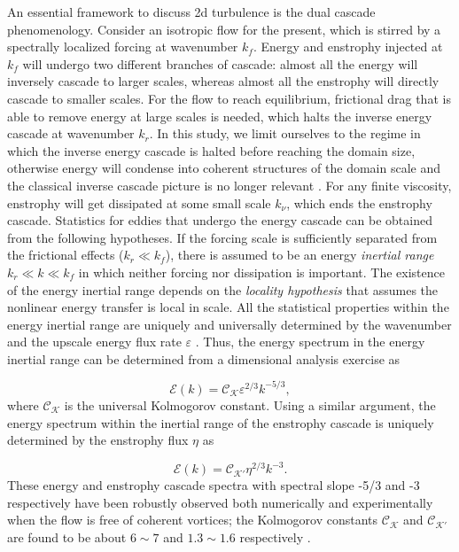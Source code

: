 \documentclass{ametsoc}
\begin{document}
An essential framework to discuss 2d turbulence is the dual
cascade phenomenology. Consider an isotropic flow for the present,
which is stirred by a spectrally localized forcing at wavenumber $k_{f}$.
Energy and enstrophy injected at $k_{f}$ will undergo two different
branches of cascade: almost all the energy will inversely cascade
to larger scales, whereas almost all the enstrophy will directly cascade
to smaller scales. For the flow to reach equilibrium, frictional drag
that is able to remove energy at large scales is needed, which halts
the inverse energy cascade at wavenumber $k_{r}$. In this study,
we limit ourselves to the regime in which the inverse energy cascade is
halted before reaching the domain size, otherwise energy will condense
into coherent structures of the domain scale and the classical inverse
cascade picture is no longer relevant \citep{Smith1993,Chertkov2007}.
For any finite viscosity, enstrophy will get dissipated at some small
scale $k_{\nu}$, which ends the enstrophy cascade. Statistics for
eddies that undergo the energy cascade can be obtained from the following
hypotheses. If the forcing scale is sufficiently separated from the
frictional effects ($k_{r}\ll k_{f}$), there is assumed to be an
energy \textit{inertial range} $k_{r}\ll k\ll k_{f}$ in which neither
forcing nor dissipation is important. The existence of the energy inertial
range depends on the \textit{locality hypothesis} that assumes the
nonlinear energy transfer is local in scale. All the statistical properties
within the energy inertial range are uniquely and universally determined
by the wavenumber and the upscale energy flux rate $\varepsilon$
\citep{Kraichnan1967,Boffetta2012,Vallis2006}. Thus, the energy spectrum
in the energy inertial range can be determined from a dimensional
analysis exercise as

\begin{equation}
\mathcal{E}(k)=\mathcal{C_{K}}\varepsilon^{2/3}k^{-5/3},\label{eq:Kolmogorov_Kraichnan_spectrum_energy}
\end{equation}
where $\mathcal{C_{K}}$ is the universal Kolmogorov constant. Using
a similar argument, the energy spectrum within the inertial range of the enstrophy cascade is uniquely determined by the enstrophy flux $\eta$ as

\begin{equation}
\mathcal{E}(k)=\mathcal{C}_{\mathcal{K}'}\eta^{2/3}k^{-3}.\label{eq:Kolmogorov_Kraichnan_spectrum_enstrophy}
\end{equation}
These energy and enstrophy cascade spectra with spectral slope -5/3
and -3 respectively have been robustly observed both numerically and
experimentally when the flow is free of coherent vortices; the Kolmogorov
constants $\mathcal{C_{K}}$ and $\mathcal{C}_{\mathcal{K}'}$ are
found to be about $6\sim7$ and $1.3\sim1.6$ respectively \citep{Maltrud1991,Smith1993,Paret1997,Chen2006,Borue1993,Gotoh1998}.
\end{document}
